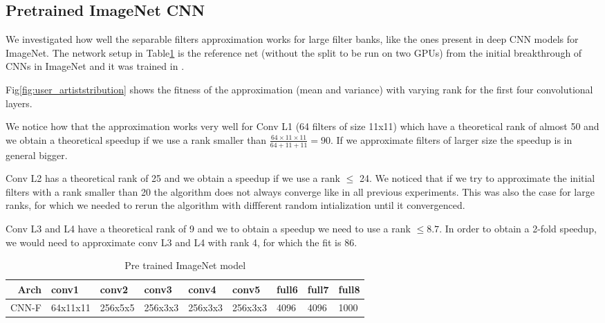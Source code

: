 \subsection{Pretrained ImageNet CNN}
We investigated how well the separable filters approximation works for large filter banks, like the ones present in deep CNN models for ImageNet. The network setup in Table\ref{fig:imagenet} is the reference net  (without the split to be run on two GPUs) from the initial breakthrough of CNNs in ImageNet \cite{Krizhevsky_imagenetclassification} and it was trained in \cite{chatfield14return}.

Fig\ref{fig:user_artiststribution} shows the fitness of the approximation (mean and variance) with varying rank for the first four convolutional layers.

We notice how that the approximation works very well for Conv L1 (64 filters of size 11x11) which have a theoretical rank of almost 50 and we obtain a theoretical speedup if we use a rank smaller than $\frac{64\times 11\times 11}{64 + 11 + 11} = 90$.
If we approximate filters of larger size the speedup is in general bigger. 

Conv L2 has a theoretical rank of 25 and we obtain a speedup if we use a rank $\leq$ 24. We noticed that if we try to approximate the initial filters with a rank smaller than 20 the algorithm does not always converge like in all previous experiments. This was also the case for large ranks, for which we needed to rerun the algorithm with diffferent random intialization until it convergenced.

Conv L3 and L4 have a theoretical rank of 9 and we to obtain a speedup we need to use a rank $\leq8.7$. In order to obtain a 2-fold speedup, we would need to approximate conv L3 and L4 with rank 4, for which the fit is 86.

\begin{table}[h!]
\centering
\begin{tabular}{@{}rllllllll@{}}\toprule
Arch & conv1 & conv2&  conv3& conv4& conv5& full6& full7 &full8 \\ \midrule
CNN-F & 64x11x11 & 256x5x5& 256x3x3&256x3x3&256x3x3&4096&4096&1000\\
\end{tabular}
\caption{Pre trained ImageNet model}
\label{fig:imagenet}
\end{table}

